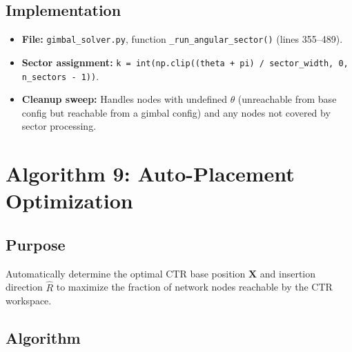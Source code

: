 \documentclass[11pt,a4paper]{article}
\newcommand{\filename}[1]{\texttt{\textcolor{accentblue}{#1}}}
\newcommand{\funcname}[1]{\texttt{\textcolor{codepurple}{#1}}}
\begin{document}
\subsection{Implementation}

\begin{itemize}[nosep]
    \item \textbf{File:} \filename{gimbal\_solver.py}, function \funcname{\_run\_angular\_sector()} (lines 355--489).
    \item \textbf{Sector assignment:} \texttt{k = int(np.clip((theta + pi) / sector\_width, 0, n\_sectors - 1))}.
    \item \textbf{Cleanup sweep:} Handles nodes with undefined $\theta$ (unreachable from base config but reachable from a gimbal config) and any nodes not covered by sector processing.
\end{itemize}


\section{Algorithm 9: Auto-Placement Optimization}
\label{sec:placement}

\subsection{Purpose}

Automatically determine the optimal CTR base position $\mathbf{X}$ and insertion direction $\hat{R}$ to maximize the fraction of network nodes reachable by the CTR workspace.

\subsection{Algorithm}
\end{document}

